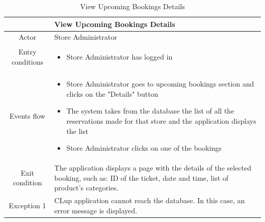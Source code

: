 \documentclass[table, 12pt]{article}
\begin{document}
\begin{minipage}{\textwidth}
    \begin{longtable}{|c| p{10cm}|}
        \caption{View Upcoming Bookings Details}                                                                                                                             \\
        \hline
                         & View Upcoming Bookings Details                                                                                                                    \\
        \hline
        Actor            & Store Administrator                                                                                                                               \\
        \hline
        Entry conditions & \begin{itemize}
            \item Store Administrator has logged in
        \end{itemize}                                                                                                                        \\
        \hline
        Events flow      & \begin{itemize}[nosep,after=\strut]
            \item Store Administrator goes to upcoming bookings section and clicks on the "Details" button
            \item The system takes from the database the list of all the reservations made for that store and the application displays the list
            \item Store Administrator clicks on one of the bookings
        \end{itemize}                                                                                                                        \\
        \hline
        Exit condition   & The application displays a page with the details of the selected booking, such as: ID of the ticket, date and time, list of product's categories.
        \\
        \hline
        \hline
        Exception 1      & CLup application cannot reach the database. In this case, an error message is displayed.                                                          \\
        \hline
    \end{longtable}


\end{minipage}
\end{document}
